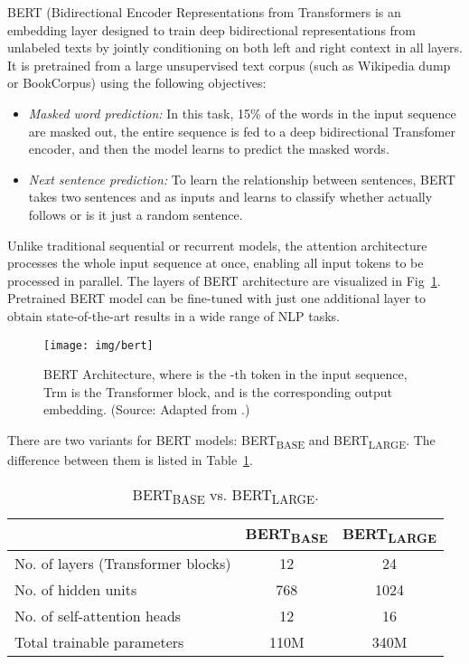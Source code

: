 \documentclass[conference]{IEEEtran}
\begin{document}
BERT (Bidirectional Encoder Representations from Transformers is an embedding layer designed to train deep bidirectional representations from unlabeled texts by jointly conditioning on both left and right context in all layers. It is pretrained from a large unsupervised text corpus (such as Wikipedia dump or BookCorpus) using the following objectives:

\begin{itemize}
    \item \emph{Masked word prediction:}
        In this task, 15\% of the words in the input sequence are masked out, the entire sequence is fed to a deep bidirectional Transfomer\cite{attention} encoder, and then the model learns to predict the masked words.
    \item \emph{Next sentence prediction:}
        To learn the relationship between sentences, BERT takes two sentences  and  as inputs and learns to classify whether  actually follows  or is it just a random sentence.
\end{itemize}

Unlike traditional sequential or recurrent models, the attention architecture processes the whole input sequence at once, enabling all input tokens to be processed in parallel. The layers of BERT architecture are visualized in Fig~\ref{fig:bert}. Pretrained BERT model can be fine-tuned with just one additional layer to obtain state-of-the-art results in a wide range of NLP tasks\cite{bert}.

\begin{figure}[ht]
    \centering
    \texttt{[image: img/bert]}
    \caption{BERT Architecture, where  is the -th token in the input sequence, Trm is the Transformer block, and  is the corresponding output embedding. (Source: Adapted from \cite{bert}.)}
    \label{fig:bert}
\end{figure}

There are two variants for BERT models: BERT\textsubscript{BASE} and BERT\textsubscript{LARGE}. The difference between them is listed in Table~\ref{tab:base-large}.

\begin{table}[ht]
    \renewcommand{\arraystretch}{1.2}
    \caption{BERT\textsubscript{BASE} vs. BERT\textsubscript{LARGE}.}
    \label{tab:base-large}
    \centering
    \begin{tabular}{lcc}
        \toprule
         & BERT\textsubscript{BASE} & BERT\textsubscript{LARGE} \\
         \midrule
        No. of layers (Transformer blocks) & 12 & 24 \\
No. of hidden units & 768 & 1024 \\
No. of self-attention heads & 12 & 16 \\
Total trainable parameters & 110M & 340M \\
        \bottomrule
    \end{tabular}
\end{table}
\end{document}
